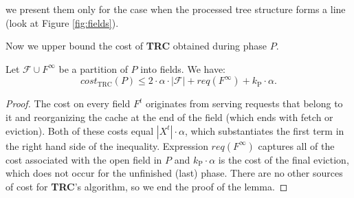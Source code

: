we present them only for the case when the processed tree structure forms a line
(look at Figure \ref{fig:fields}).

Now we upper bound the cost of \textbf{TRC} obtained during phase $P$.
\begin{lemma} Let $\mathcal{F} \cup F^{\infty}$ be a partition of $P$ into
fields. We have:
\begin{equation*}
cost_{\mathrm{TRC}}(P) \leq 2 \cdot \alpha \cdot
|\mathcal{F}| + req(F^{\infty}) + k_{\mathrm{P}} \cdot \alpha.
\end{equation*}
\label{thm:trc_cost}
\end{lemma}
\vspace{-3.5em}
\begin{proof} The cost on every field $F^t$ originates from serving
requests that belong to it and reorganizing the cache at the end of the field
(which ends with fetch or eviction). Both of these costs equal $|X^t| \cdot
\alpha$, which substantiates the first term in the right hand side of the inequality.
Expression $req(F^{\infty})$ captures all of the cost associated with the open
field in $P$ and $k_{\mathrm{P}} \cdot \alpha$ is the cost of the final eviction, which
does not occur for the unfinished (last) phase. There are no other sources of
cost for \textbf{TRC}'s algorithm, so we end the proof of the lemma.
\end{proof}

